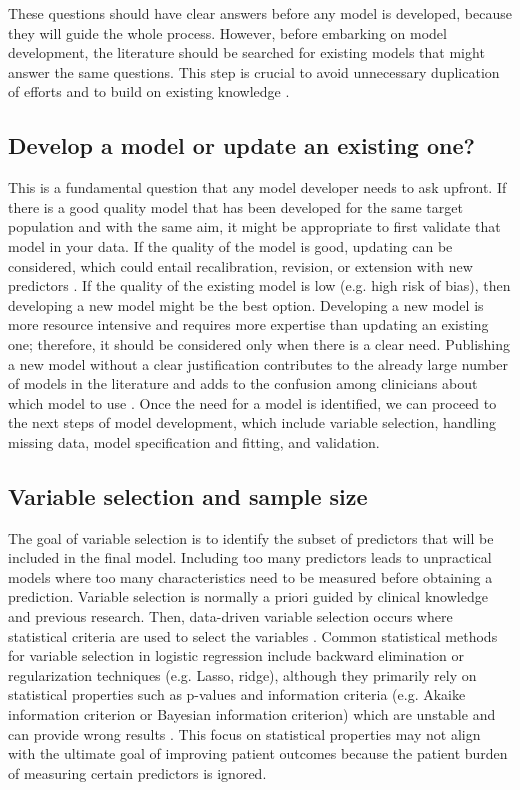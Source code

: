 These questions should have clear answers before any model is developed, because they will guide the whole process. However, before embarking on model development, the literature should be searched for existing models that might answer the same questions. This step is crucial to avoid unnecessary duplication of efforts and to build on existing knowledge \cite{smitsImprovingHealthCare2026}. 

\subsection{Develop a model or update an existing one?}

This is a fundamental question that any model developer needs to ask upfront. If there is a good quality model that has been developed for the same target population and with the same aim, it might be appropriate to first validate that model in your data. If the quality of the model is good, updating can be considered, which could entail recalibration, revision, or extension with new predictors \cite{vancalsterValidationUpdatingRisk2017}. If the quality of the existing model is low (e.g. high risk of bias), then developing a new model might be the best option. Developing a new model is more resource intensive and requires more expertise than updating an existing one; therefore, it should be considered only when there is a clear need. Publishing a new model without a clear justification contributes to the already large number of models in the literature and adds to the confusion among clinicians about which model to use \cite{arshiNumberPublicationsNew2025}. Once the need for a model is identified, we can proceed to the next steps of model development, which include variable selection, handling missing data, model specification and fitting, and validation.

\subsection{Variable selection and sample size}

The goal of variable selection is to identify the subset of predictors that will be included in the final model. Including too many predictors leads to unpractical models where too many characteristics need to be measured before obtaining a prediction. Variable selection is normally a priori guided by clinical knowledge and previous research. Then, data-driven variable selection occurs where statistical criteria are used to select the variables \cite{heinzeVariableSelectionReview2018}. Common statistical methods for variable selection in logistic regression include backward elimination or regularization techniques (e.g. Lasso, ridge), although they primarily rely on statistical properties such as p-values and information criteria (e.g. Akaike information criterion or Bayesian information criterion) which are unstable and can provide wrong results \cite{heinzeFiveMythsVariable2017}. This focus on statistical properties may not align with the ultimate goal of improving patient outcomes because the patient burden of measuring certain predictors is ignored. 

